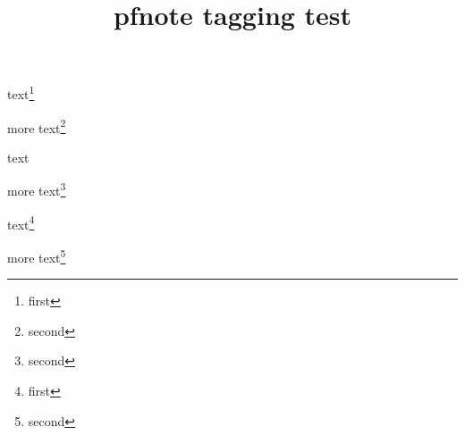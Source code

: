 \documentclass{article}
\title{pfnote tagging test}
\begin{document}
text\footnote{first}

more text\footnote{second}

\newpage

text\footnotemark
{}

more text\footnote{second}

\newpage

text\footnote{first}

more text\footnote{second}
\end{document}
